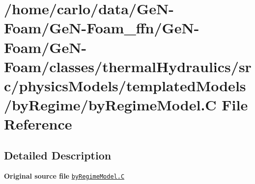\hypertarget{byRegimeModel_8C}{}\section{/home/carlo/data/\+Ge\+N-\/\+Foam/\+Ge\+N-\/\+Foam\+\_\+ffn/\+Ge\+N-\/\+Foam/\+Ge\+N-\/\+Foam/classes/thermal\+Hydraulics/src/physics\+Models/templated\+Models/by\+Regime/by\+Regime\+Model.C File Reference}
\label{byRegimeModel_8C}


\subsection{Detailed Description}
{\bfseries Original source file} \href{../../../home/carlo/data/GeN-Foam/GeN-Foam_ffn/GeN-Foam/GeN-Foam/classes/thermalHydraulics/src/physicsModels/templatedModels/byRegime/byRegimeModel.C}{\tt by\+Regime\+Model.\+C} 